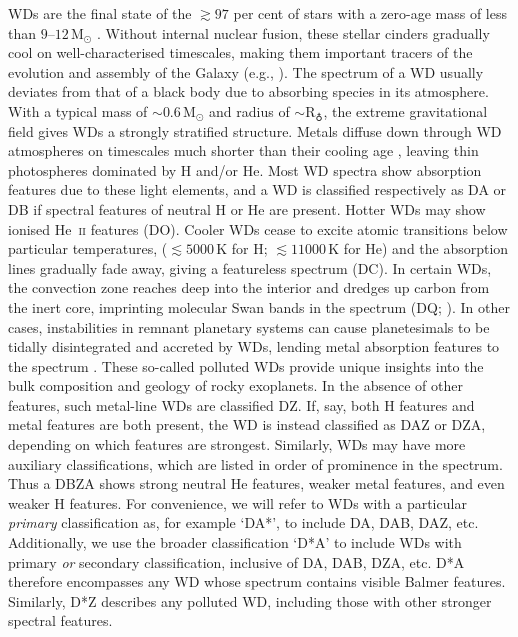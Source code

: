 \documentclass[fleqn,usenatbib]{mnras}
\begin{document}
WDs are the final state of the $\gtrsim97$ per cent of stars with a zero-age mass of less than $9$--$12\,\mathrm{M}_\odot$ \citep{lauffer18, althaus10, althaus21}.
Without internal nuclear fusion, these stellar cinders gradually cool on well-characterised timescales, making them important tracers of the evolution and assembly of the Galaxy (e.g., \citealt{winget87, tremblay14}).
The spectrum of a WD usually deviates from that of a black body due to absorbing species in its atmosphere.
With a typical mass of $\sim0.6\,\mathrm{M}_\odot$ and radius of $\sim \mathrm{R}_{\earth}$, the extreme gravitational field gives WDs a strongly stratified structure.
Metals diffuse down through WD atmospheres on timescales much shorter than their cooling age \citep{schatzman45, paquette86, koester09, wyatt14}, leaving thin photospheres dominated by H and/or He.
Most WD spectra show absorption features due to these light elements, and a WD is classified respectively as DA or DB if spectral features of neutral H or He are present.
Hotter WDs may show ionised  He~\textsc{ii} features (DO).
Cooler WDs cease to excite atomic transitions below particular temperatures, ($\lesssim5000\,\text{K}$ for H; $\lesssim 11000\,\text{K}$ for He) and the absorption lines gradually fade away, giving a featureless spectrum (DC).
In certain WDs, the convection zone reaches deep into the interior and dredges up carbon from the inert core, imprinting molecular  Swan bands in the spectrum (DQ; \citealt{fontaine84, koester82, koester20, blouin23}).
In other cases, instabilities in remnant planetary systems can cause planetesimals to be tidally disintegrated and accreted by WDs, lending metal absorption features to the spectrum \citep{bonsor11, frewen14, mustill18, maldonado20}.
These so-called polluted WDs provide unique insights into the bulk composition and geology of rocky exoplanets.
In the absence of other features, such metal-line WDs are classified DZ.
If, say, both H features and metal features are both present, the WD is instead classified as DAZ or DZA, depending on which features are strongest.
Similarly, WDs may have more auxiliary classifications, which are listed in order of prominence in the spectrum.
Thus a DBZA shows strong neutral He features, weaker metal features, and even weaker H features. For convenience, we will refer to WDs with a particular \textit{primary} classification as, for example `DA*', to include DA, DAB, DAZ, etc.
Additionally, we use the broader classification `D*A' to include WDs with primary \textit{or} secondary classification, inclusive of DA, DAB, DZA, etc.
D*A therefore encompasses any WD whose spectrum contains visible Balmer features.
Similarly, D*Z describes any polluted WD, including those with other stronger spectral features.
\end{document}
